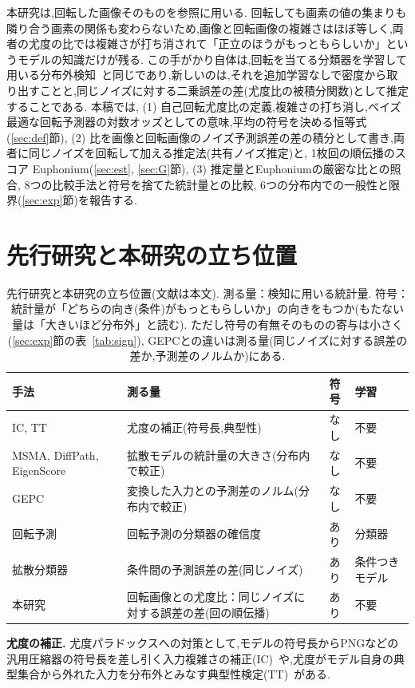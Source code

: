 \documentclass[MIRU,submit,onecolumn]{miru2025j}
\begin{document}
本研究は,回転した画像そのものを参照に用いる.%
回転しても画素の値の集まりも隣り合う画素の関係も変わらないため,画像と回転画像の複雑さはほぼ等しく,両者の尤度の比では複雑さが打ち消されて「正立のほうがもっともらしいか」というモデルの知識だけが残る.%
この手がかり自体は,回転を当てる分類器を学習して用いる分布外検知~\cite{golan2018geometric,hendrycks2019ss,tack2020csi}と同じであり,新しいのは,それを追加学習なしで密度から取り出すことと,同じノイズに対する二乗誤差の差(尤度比の被積分関数)として推定することである.%
本稿では, (1) 自己回転尤度比の定義,複雑さの打ち消し,ベイズ最適な回転予測器の対数オッズとしての意味,平均の符号を決める恒等式(\ref{sec:def}節), (2) 比を画像と回転画像のノイズ予測誤差の差の積分として書き,両者に同じノイズを回転して加える推定法(共有ノイズ推定)と, 1枚\nfeG{}回の順伝播のスコア Euphonium(\ref{sec:est}, \ref{sec:G}節), (3) 推定量とEuphoniumの厳密な比との照合, 8つの比較手法と符号を捨てた統計量との比較, 6つの分布内での一般性と限界(\ref{sec:exp}節)を報告する.

\section{先行研究と本研究の立ち位置}
\label{sec:related}
\begin{table}[t]\centering\footnotesize\setlength{\tabcolsep}{2.5pt}
\caption{先行研究と本研究の立ち位置(文献は本文). 測る量：検知に用いる統計量. 符号：統計量が「どちらの向き(条件)がもっともらしいか」の向きをもつか(もたない量は「大きいほど分布外」と読む). ただし符号の有無そのものの寄与は小さく(\ref{sec:exp}節の表~\ref{tab:sign}), GEPCとの違いは測る量(同じノイズに対する誤差の差か,予測差のノルムか)にある.}
\label{tab:related}
\begin{tabular}{@{}>{\raggedright\arraybackslash}p{38mm}>{\raggedright\arraybackslash}p{66mm}c>{\raggedright\arraybackslash}p{24mm}@{}}\toprule
手法 & 測る量 & 符号 & 学習\\\midrule
IC, TT & 尤度の補正(符号長,典型性) & なし & 不要\\\addlinespace[1pt]
MSMA, DiffPath, EigenScore & 拡散モデルの統計量の大きさ(分布内で較正) & なし & 不要\\\addlinespace[1pt]
GEPC & 変換した入力との予測差のノルム(分布内で較正) & なし & 不要\\\midrule
回転予測 & 回転予測の分類器の確信度 & あり & 分類器\\\addlinespace[1pt]
拡散分類器 & 条件間の予測誤差の差(同じノイズ) & あり & 条件つきモデル\\\midrule
本研究 & 回転画像との尤度比：同じノイズに対する誤差の差(\nfeG{}回の順伝播) & あり & 不要\\\bottomrule
\end{tabular}
\end{table}
\textbf{尤度の補正.}
尤度パラドックスへの対策として,モデルの符号長からPNGなどの汎用圧縮器の符号長を差し引く入力複雑さの補正(IC)~\cite{serra2020input}や,尤度がモデル自身の典型集合から外れた入力を分布外とみなす典型性検定(TT)~\cite{nalisnick2019typ}がある.
\end{document}
